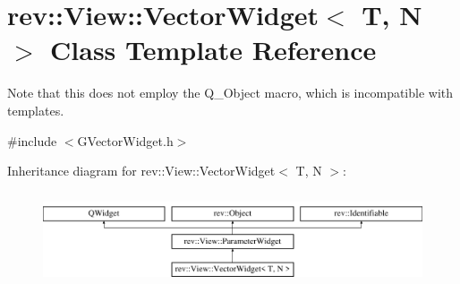 \hypertarget{classrev_1_1_view_1_1_vector_widget}{}\section{rev\+::View\+::Vector\+Widget$<$ T, N $>$ Class Template Reference}
\label{classrev_1_1_view_1_1_vector_widget}


Note that this does not employ the Q\+\_\+\+Object macro, which is incompatible with templates.  




{\ttfamily \#include $<$G\+Vector\+Widget.\+h$>$}

Inheritance diagram for rev\+::View\+::Vector\+Widget$<$ T, N $>$\+:\begin{figure}[H]
\begin{center}
\leavevmode
\includegraphics[height=2.745098cm]{classrev_1_1_view_1_1_vector_widget}
\end{center}
\end{figure}
